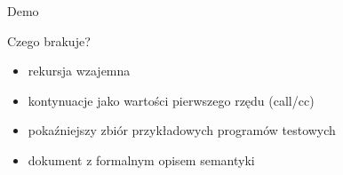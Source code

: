 \documentclass[12pt,serif]{beamer}
\begin{document}
\begin{frame}
\begin{center}
   \LARGE{Demo}
\end{center}
\end{frame}

\begin{frame}{Czego brakuje?}
\begin{itemize}
   \item rekursja wzajemna
   \item kontynuacje jako wartości pierwszego rzędu (call/cc)
   \item pokaźniejszy zbiór przykładowych programów testowych
   \item dokument z formalnym opisem semantyki
\end{itemize}
\end{frame}
\end{document}

